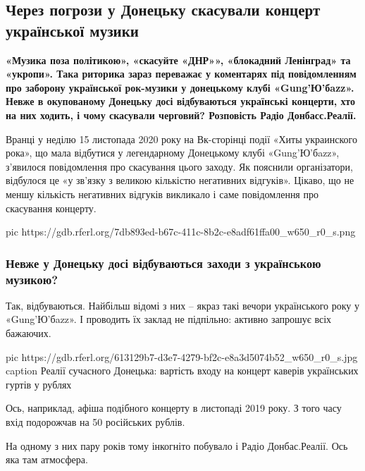  
 
 
 
\subsection{Через погрози у Донецьку скасували концерт української музики}

{\bfseries
«Музика поза політикою», «скасуйте «ДНР»», «блокадний Ленінград» та
«укропи». Така риторика зараз переважає у коментарях під повідомленням
про заборону української рок-музики у донецькому клубі «Gung'Ю'бazz».
Невже в окупованому Донецьку досі відбуваються українські концерти, хто на
них ходить, і чому скасували черговий? Розповість Радіо Донбасс.Реалії.
}

Вранці у неділю 15 листопада 2020 року на Вк-сторінці події «Хиты
украинского рока», що мала відбутися у легендарному Донецькому клубі
«Gung'Ю'бazz», з’явилося повідомлення про скасування цього заходу. Як
пояснили організатори, відбулося це «у зв’язку з великою кількістю
негативних відгуків». Цікаво, що не меншу кількість негативних відгуків
викликало і саме повідомлення про скасування концерту.

\ifcmt
pic https://gdb.rferl.org/7db893ed-b67c-411c-8b2c-e8adf61ffa00_w650_r0_s.png
\fi

\subsubsection{Невже у Донецьку досі відбуваються заходи з українською музикою?}

Так, відбуваються. Найбільш відомі з них – якраз такі вечори українського
року у «Gung'Ю'бazz». І проводить їх заклад не підпільно: активно запрошує
всіх бажаючих.

\ifcmt
pic https://gdb.rferl.org/613129b7-d3e7-4279-bf2c-e8a3d5074b52_w650_r0_s.jpg
caption Реалії сучасного Донецька: вартість входу на концерт каверів українських гуртів у рублях
\fi

Ось, наприклад, афіша подібного концерту в листопаді 2019 року. З того часу
вхід подорожчав на 50 російських рублів.

На одному з них пару років тому інкогніто побувало і Радіо Донбас.Реалії.
Ось яка там атмосфера.

